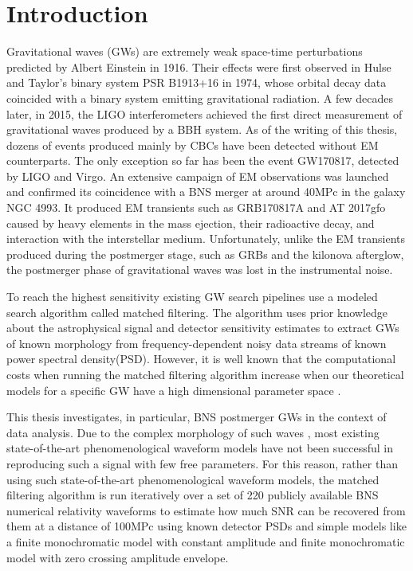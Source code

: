 
\chapter*{Introduction}

Gravitational waves (GWs) are extremely weak space-time perturbations predicted by Albert Einstein in 1916\cite{Einstein:1916cc}. Their effects were first observed in Hulse and Taylor's binary system PSR B1913+16 in 1974, whose orbital decay data coincided with a binary system emitting gravitational radiation\cite{Weisberg:1981mt}. A few decades later, in 2015, the LIGO interferometers achieved the first direct measurement of gravitational waves produced by a BBH system\cite{LIGOScientific:2016aoc}. As of the writing of this thesis, dozens of events produced mainly by CBCs have been detected without EM counterparts. The only exception so far has been the event GW170817\cite{LIGOScientific:2017vwq}, detected by LIGO and Virgo. An extensive campaign of EM observations was launched and confirmed its coincidence with a BNS merger at around 40MPc in the galaxy NGC 4993. It produced EM transients such as GRB170817A and AT 2017gfo caused by heavy elements in the mass ejection, their radioactive decay, and interaction with the interstellar medium\cite{Abbott_2017, LIGOScientific:2017ync, 10.1093/mnras/stz1564}. Unfortunately, unlike the EM transients produced during the postmerger stage, such as GRBs and the kilonova afterglow, the postmerger phase of gravitational waves was lost in the instrumental noise\cite{LIGOScientific:2018hze, LIGOScientific:2018urg, LIGOScientific:2017fdd}. 

To reach the highest sensitivity existing GW search pipelines use a modeled search algorithm called matched filtering. The algorithm uses prior knowledge about the astrophysical signal and detector sensitivity estimates to extract GWs of known morphology from frequency-dependent noisy data streams of known power spectral density(PSD)\cite{Usman:2015kfa, Sachdev:2019vvd, Aubin:2020goo}. However, it is well known that the computational costs when running the matched filtering algorithm increase when our theoretical models for a specific GW have a high dimensional parameter space \cite{Allen_2021, Dhurkunde:2021csz}.

This thesis investigates, in particular, BNS postmerger GWs in the context of data analysis. Due to the complex morphology of such waves \cite{Maggiore:2018sht, Shibata:2019wef,Radice_2020}, most existing state-of-the-art phenomenological waveform models have not been successful in reproducing such a signal with few free parameters\cite{Breschi:2019srl, Tsang:2019esi, Soultanis:2021oia, https://doi.org/10.48550/arxiv.2205.09112}. For this reason, rather than using such state-of-the-art phenomenological waveform models, the matched filtering algorithm is run iteratively over a set of 220 publicly available BNS numerical relativity waveforms to estimate how much SNR can be recovered from them at a distance of 100MPc using known detector PSDs and simple models like a finite monochromatic model with constant amplitude and finite monochromatic model with zero crossing amplitude envelope.

